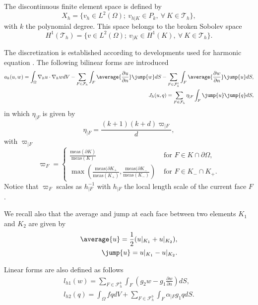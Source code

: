 \documentclass[a4paper,11pt]{article}
\begin{document}
The discontinuous finite element space is defined by
\begin{equation}
  X_h=\{v_h\in L^2(\Omega);\ v_{h|K}\in P_k,\ \forall\ K\in \mathcal{T}_h\},
\end{equation}
with $k$ the polynomial degree. This space belongs to the broken Sobolev space
\begin{equation}
  H^1(\mathcal{T}_h)=\{v\in L^2(\Omega);\ v_{|K}\in H^1(K),\ \forall\ K\in \mathcal{T}_h\}.
\end{equation}

The discretization is established according to developments used for harmonic equation \cite[Chap. 4]{DIPIETROERN2012}. The following bilinear forms are introduced
\begin{eqnarray}
  a_h(u,w)=\int_{\Omega}\nabla_hu\cdot\nabla_hwdV-\sum_{F\in\mathcal{F}_h}\int_{F}\average{\frac{\partial u}{\partial n}}
           \jump{w}dS-
           \sum_{F\in\mathcal{F}^i_h}\int_{F}\average{\frac{\partial w}{\partial n}}\jump{u}dS,\\
  J_h(u,q)=\sum_{F\in\mathcal{F}_h}\eta_{|F}\int_{F}\jump{u}\jump{q}dS,
\end{eqnarray}
in which $\eta_{|F}$ is given by \cite{SHAHBAZI2005}
\begin{equation}
  \eta_{|F}=\frac{(k+1)(k+d)\varpi_{|F}}{d},
\end{equation}
with $\varpi_{|F}$
\begin{equation}
  \varpi_F=\left\lbrace
      \begin{array}{lr}
        \frac{\mathrm{meas}(\partial K)}{\mathrm{meas}(K)}&\mbox{ for }F\in K\cap\partial\Omega,\\
        \max\left(\frac{\mathrm{meas}(\partial K_+}{\mathrm{meas}(K_+)},\frac{\mathrm{meas}(\partial K_-}{\mathrm{meas}(K_-)}\right)&
        \mbox{ for }F\in K_-\cap K_+.
      \end{array}
      \right.
\end{equation}
Notice that $\varpi_F$ scales as $h_{|F}^{-1}$ with $h_{|F}$ the local length scale of the current face $F$.

We recall also that the average and jump at each face between two elements $K_1$ and $K_2$ are given by
\begin{eqnarray}
  \average{u}=\frac{1}{2}(u|_{K_1}+u|_{K_2}),\\
  \jump{u}=u|_{K_1}-u|_{K_2}.
\end{eqnarray}

Linear forms are also defined as follows
\begin{eqnarray}
  l_{h1}(w)=\sum_{F\in\mathcal{F}^b_h}\int_{F}\left(g_2w-g_1\frac{\partial w}{\partial n}\right)dS,\\
  l_{h2}(q)=\int_{\Omega}fqdV+\sum_{F\in\mathcal{F}^b_h}\int_{F}\alpha_{|F}g_1qdS.
\end{eqnarray}
\end{document}
